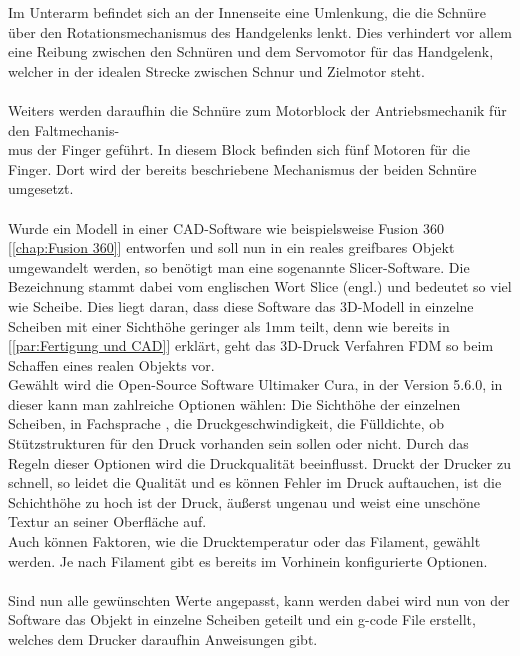 \documentclass[titlepage,12pt,twoside]{article}
\begin{document}
\hfill \break
Im Unterarm befindet sich an der Innenseite eine Umlenkung, die die Schnüre über den Rotationsmechanismus des Handgelenks lenkt. Dies verhindert vor allem eine Reibung zwischen den Schnüren und dem Servomotor für das Handgelenk, welcher in der 
idealen Strecke zwischen Schnur und Zielmotor steht. \\
\\
Weiters werden daraufhin die Schnüre zum Motorblock der Antriebsmechanik für den Faltmechanis-\\mus der Finger geführt. In diesem Block befinden sich fünf Motoren für die Finger.
Dort wird der bereits beschriebene Mechanismus der beiden Schnüre umgesetzt. \\
\\
Wurde ein Modell in einer CAD-Software wie beispielsweise Fusion 360 [\textcolor{blue}{\autoref{chap:Fusion 360}}] entworfen und soll nun in ein reales greifbares Objekt umgewandelt werden, so benötigt man eine sogenannte Slicer-Software. Die Bezeichnung  stammt dabei vom englischen 
Wort Slice (engl.) und bedeutet so viel wie Scheibe. Dies liegt daran, dass diese Software das 3D-Modell in einzelne Scheiben mit einer Sichthöhe geringer als 1mm teilt, denn wie bereits in [\textcolor{blue}{\autoref{par:Fertigung und CAD}}] erklärt, geht das 3D-Druck Verfahren 
FDM so beim Schaffen eines realen Objekts vor. \\
Gewählt wird die Open-Source Software Ultimaker Cura, in der Version 5.6.0, in dieser kann man zahlreiche Optionen wählen: Die Sichthöhe der einzelnen Scheiben, in Fachsprache , die Druckgeschwindigkeit, die Fülldichte, ob Stützstrukturen für den 
Druck vorhanden sein sollen oder nicht. Durch das Regeln dieser Optionen wird die Druckqualität beeinflusst. Druckt der Drucker zu schnell, so leidet die Qualität und es können Fehler im Druck auftauchen, ist die Schichthöhe zu hoch ist der Druck, 
äußerst ungenau und weist eine unschöne Textur an seiner Oberfläche auf. \\
Auch können Faktoren, wie die Drucktemperatur oder das Filament, gewählt werden. Je nach Filament gibt es bereits im Vorhinein konfigurierte Optionen. \\
\\
Sind nun alle gewünschten Werte angepasst, kann  werden dabei wird nun von der Software das Objekt in einzelne Scheiben geteilt und ein g-code File erstellt, welches dem Drucker daraufhin Anweisungen gibt. \\
\\
\end{document}
